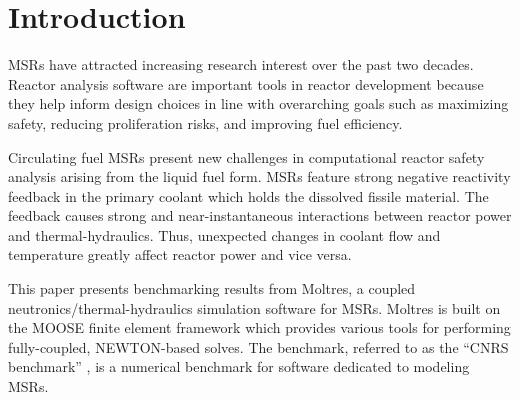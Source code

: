 \section{Introduction}

\glspl{MSR} have attracted increasing research interest over the past two
decades. Reactor
analysis software are important tools in reactor development because
they help inform design choices in line with overarching goals such as
maximizing safety, reducing proliferation risks, and improving fuel
efficiency.

Circulating fuel \glspl{MSR} present new challenges in computational reactor
safety analysis arising from the liquid fuel form. \glspl{MSR} feature strong
negative reactivity feedback in the primary coolant which holds the dissolved
fissile material. The feedback causes strong and near-instantaneous
interactions between reactor power and thermal-hydraulics. Thus,
unexpected changes in coolant flow and temperature greatly affect reactor
power and vice versa.

This paper presents benchmarking results from Moltres, a coupled
neutronics/thermal-hydraulics simulation software for \glspl{MSR}. Moltres is
built on the \gls{MOOSE} \cite{gaston_physics-based_2015} finite element
framework which provides various tools for performing fully-coupled,
NEWTON-based solves. The benchmark, referred to as the ``CNRS benchmark''
\cite{tiberga_results_2020}, is a numerical benchmark for software dedicated to
modeling \glspl{MSR}.
